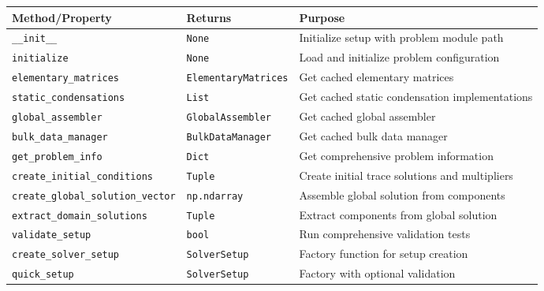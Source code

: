 \begin{longtable}{|p{4cm}|p{2.5cm}|p{6.5cm}|}
\hline
\textbf{Method/Property} & \textbf{Returns} & \textbf{Purpose} \\
\hline
\endhead

\texttt{\_\_init\_\_} & \texttt{None} & Initialize setup with problem module path \\
\hline

\texttt{initialize} & \texttt{None} & Load and initialize problem configuration \\
\hline

\texttt{elementary\_matrices} & \texttt{ElementaryMatrices} & Get cached elementary matrices \\
\hline

\texttt{static\_condensations} & \texttt{List} & Get cached static condensation implementations \\
\hline

\texttt{global\_assembler} & \texttt{GlobalAssembler} & Get cached global assembler \\
\hline

\texttt{bulk\_data\_manager} & \texttt{BulkDataManager} & Get cached bulk data manager \\
\hline

\texttt{get\_problem\_info} & \texttt{Dict} & Get comprehensive problem information \\
\hline

\texttt{create\_initial\_conditions} & \texttt{Tuple} & Create initial trace solutions and multipliers \\
\hline

\texttt{create\_global\_solution\_vector} & \texttt{np.ndarray} & Assemble global solution from components \\
\hline

\texttt{extract\_domain\_solutions} & \texttt{Tuple} & Extract components from global solution \\
\hline

\texttt{validate\_setup} & \texttt{bool} & Run comprehensive validation tests \\
\hline

\texttt{create\_solver\_setup} & \texttt{SolverSetup} & Factory function for setup creation \\
\hline

\texttt{quick\_setup} & \texttt{SolverSetup} & Factory with optional validation \\
\hline

\end{longtable}

